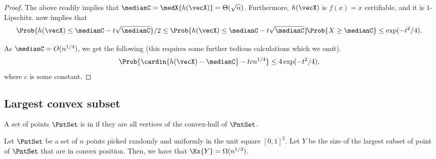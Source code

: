 \begin{proof}
    The above readily implies that
    $\medianC = \medX{h(\vecX)} = \Theta( \sqrt{n})$. Furthermore,
    $h(\vecX)$ is $f(x) =x$ certifiable, and it is $1$-Lipschitz.
     now implies that
    \begin{equation*} 
        \Prob{ h(\vecX) \leq \medianC - t\sqrt{\medianC}}/2
        \leq%
        \Prob{ h(\vecX) \leq \medianC - t\sqrt{\medianC}}%
        \!\Prob{X \geq \medianC} \leq \exp(-t^2/4).
    \end{equation*}

    As $\medianC = O(n^{1/4})$, we get the following (this requires
    some further tedious calculations which we omit).
    \begin{equation*} 
        \Prob{ \cardin{\bigl. h(\vecX) - \medianC} - t cn^{1/4}}        
        \leq%
        4 \exp(-t^2/4),
    \end{equation*}
    where $c$ is some constant.
\end{proof}




\subsection{Largest convex subset}

A set of points $\PntSet$ is in  if they are
all vertices of the convex-hull of $\PntSet$.

\begin{lemma}
    Let $\PntSet$ be a set of $n$ points picked randomly and uniformly
    in the unit square $[0,1]^2$. Let $Y$ be the size of the largest
    subset of point of $\PntSet$ that are in convex position. Then, we
    have that $\Ex{Y} = \Omega(n^{1/3})$.
\end{lemma}

